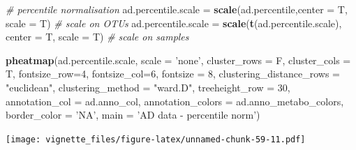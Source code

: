 \documentclass[]{book}
\newenvironment{Shaded}{\begin{snugshade}}{\end{snugshade}}
\newcommand{\KeywordTok}[1]{\textcolor[rgb]{0.13,0.29,0.53}{\textbf{#1}}}
\newcommand{\DataTypeTok}[1]{\textcolor[rgb]{0.13,0.29,0.53}{#1}}
\newcommand{\DecValTok}[1]{\textcolor[rgb]{0.00,0.00,0.81}{#1}}
\newcommand{\StringTok}[1]{\textcolor[rgb]{0.31,0.60,0.02}{#1}}
\newcommand{\CommentTok}[1]{\textcolor[rgb]{0.56,0.35,0.01}{\textit{#1}}}
\newcommand{\NormalTok}[1]{#1}
\begin{document}
\begin{Shaded}
\begin{Highlighting}[]
\CommentTok{# percentile normalisation}
\NormalTok{ad.percentile.scale =}\StringTok{ }\KeywordTok{scale}\NormalTok{(ad.percentile,}\DataTypeTok{center =}\NormalTok{ T, }\DataTypeTok{scale =}\NormalTok{ T) }\CommentTok{# scale on OTUs}
\NormalTok{ad.percentile.scale =}\StringTok{ }\KeywordTok{scale}\NormalTok{(}\KeywordTok{t}\NormalTok{(ad.percentile.scale), }\DataTypeTok{center =}\NormalTok{ T, }\DataTypeTok{scale =}\NormalTok{ T) }\CommentTok{# scale on samples}

\KeywordTok{pheatmap}\NormalTok{(ad.percentile.scale, }
         \DataTypeTok{scale =} \StringTok{'none'}\NormalTok{, }
         \DataTypeTok{cluster_rows =}\NormalTok{ F, }
         \DataTypeTok{cluster_cols =}\NormalTok{ T, }
         \DataTypeTok{fontsize_row=}\DecValTok{4}\NormalTok{, }\DataTypeTok{fontsize_col=}\DecValTok{6}\NormalTok{,}
         \DataTypeTok{fontsize =} \DecValTok{8}\NormalTok{,}
         \DataTypeTok{clustering_distance_rows =} \StringTok{"euclidean"}\NormalTok{,}
         \DataTypeTok{clustering_method =} \StringTok{"ward.D"}\NormalTok{,}
         \DataTypeTok{treeheight_row =} \DecValTok{30}\NormalTok{,}
         \DataTypeTok{annotation_col =}\NormalTok{ ad.anno_col,}
         \DataTypeTok{annotation_colors =}\NormalTok{ ad.anno_metabo_colors,}
         \DataTypeTok{border_color =} \StringTok{'NA'}\NormalTok{,}
         \DataTypeTok{main =} \StringTok{'AD data - percentile norm'}\NormalTok{)}
\end{Highlighting}
\end{Shaded}

\texttt{[image: vignette\_files/figure-latex/unnamed-chunk-59-11.pdf]}
\end{document}
